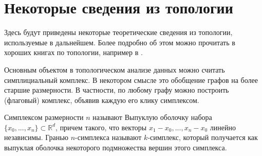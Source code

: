 \section{Некоторые сведения из топологии}
Здесь будут приведены некоторые теоретические сведения из топологии, используемые в дальнейшем. Более подробно об этом можно прочитать в хороших книгах по топологии, например в \cite{Viro, Vick, Hatcher}.%

Основным объектом в топологическом анализе данных можно считать симплициальный комплекс. В некотором смысле это обобщение графов на более старшие размерности. В частности, по любому графу можно построить (флаговый) комплекс, объявив каждую его клику симплексом.

Симплексом размерности $n$ называют Выпуклую оболочку набора $\{ x_0, ..., x_n \} \subset \mathbb{R}^d$, причем такого, что векторы $ x_1 - x_0, ..., x_n - x_0 $ линейно независимы. Гранью $n$-симплекса называют $k$-симплекс, который получается как выпуклая оболочка некоторого подмножества вершин этого симплекса.


